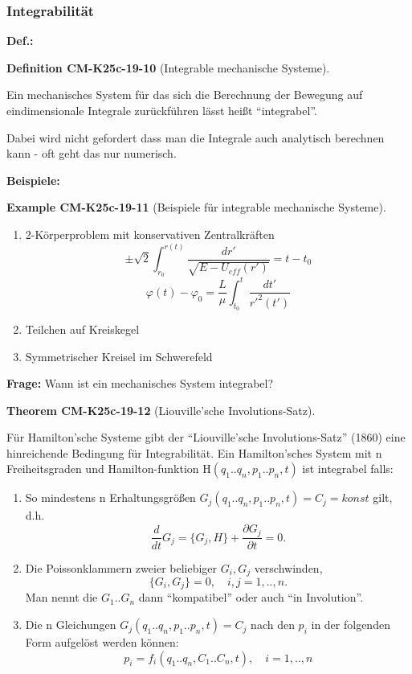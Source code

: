 \documentclass[10pt, letterpaper]{article}
\newcommand{\CustomHeading}[3]{%
  \par\medskip\noindent%
  \textbf{#1 #2} \textnormal{(#3)}.\enskip%
}
\newenvironment{DEF}[2]{\begin{unitbox}\CustomHeading{Definition}{#1}{#2}}{\end{unitbox}}
\newenvironment{THEO}[2]{\begin{unitbox}\CustomHeading{Theorem}{#1}{#2}}{\end{unitbox}}
\newenvironment{EXA}[2]{\begin{unitbox}\CustomHeading{Example}{#1}{#2}}{\end{unitbox}}
\begin{document}
\pagebreak

\subsubsection*{Integrabilität}

\noindent
\textbf{Def.:} 


\begin{DEF}{CM-K25c-19-10}{Integrable mechanische Systeme}
Ein mechanisches System für das sich die Berechnung der Bewegung auf eindimensionale Integrale zurückführen lässt heißt ``integrabel''.
\end{DEF}

\noindent
Dabei wird nicht gefordert dass man die Integrale auch analytisch berechnen kann - oft geht das nur numerisch.


\textbf{Beispiele:}
\begin{EXA}{CM-K25c-19-11}{Beispiele für integrable mechanische Systeme}
\begin{enumerate}
\item 2-Körperproblem mit konservativen Zentralkräften
\[
\pm\sqrt{2}\int_{r_0}^{r(t)}\frac{dr'}{\sqrt{E-U_{eff}(r')}} = t-t_0
\]
\[
\varphi(t)-\varphi_0 = \frac{L}{\mu}\int_{t_0}^t\frac{dt'}{r'^2(t')}
\]

\item Teilchen auf Kreiskegel

\item Symmetrischer Kreisel im Schwerefeld
\end{enumerate}
\end{EXA}

\noindent
\textbf{Frage:} Wann ist ein mechanisches System integrabel?


\begin{THEO}{CM-K25c-19-12}{Liouville'sche Involutions-Satz}
Für Hamilton'sche Systeme gibt der ``Liouville'sche Involutions-Satz'' (1860) eine hinreichende Bedingung für Integrabilität.
\noindent
Ein Hamilton'sches System mit n Freiheitsgraden und Hamilton-funktion H$(q_1..q_n,p_1..p_n,t)$ ist integrabel falls:

\begin{enumerate}
\item So mindestens n Erhaltungsgrößen $G_j(q_1..q_n,p_1..p_n,t)=C_j=konst$ gilt, d.h. 
\[\frac{d}{dt}G_j = \{G_j,H\} + \frac{\partial G_j}{\partial t} = 0.\]

\item Die Poissonklammern zweier beliebiger $G_i,G_j$ verschwinden,
\[\{G_i,G_j\} = 0, \quad i,j=1,..,n.\]
Man nennt die $G_1..G_n$ dann ``kompatibel'' oder auch ``in Involution''.

\item Die n Gleichungen $G_j(q_1..q_n,p_1..p_n,t)=C_j$ nach den $p_i$ in der folgenden Form aufgelöst werden können:
\[p_i = f_i(q_1..q_n,C_1..C_n,t), \quad i=1,..,n\]
\end{enumerate}
\end{THEO}
\end{document}
